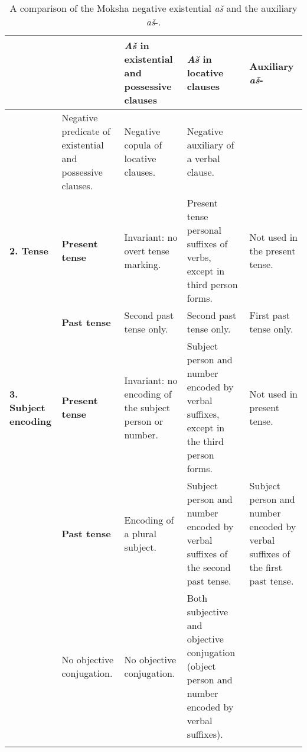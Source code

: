 \documentclass[output=paper]{langsci/langscibook}
\begin{document}
\begin{table}
\newlength{\colconj}
\newlength{\colexist}\settowidth{\colexist}{encoding of the}
\newlength{\colloc}\settowidth{\colloc}{verbal suffixes of}
\newlength{\colaux}\settowidth{\colaux}{verbal suffixes of}
\caption{A comparison of the Moksha negative existential \textit{aš} and the auxiliary \textit{aš}-.}
\label{tab:2:7}
\begin{tabularx}{\textwidth}{@{} p{\colclausfunc} p{\coltense} p{\colexist} p{\colloc} p{\colaux} @{}}
\lsptoprule
					&					&\textbf{\textit{Aš} in existential and possessive clauses}&\textbf{\textit{Aš} in locative clauses} 	&\textbf{Auxiliary \textit{aš}-}			\\
\midrule
\tablevspace
\multicolumn{2}{@{} l @{}}{
\textbf{1. Clausal function}}			&Negative predicate of existential and possessive clauses.	&Negative copula of locative clauses.			&Negative auxiliary of a verbal clause.\\
\tablevspace
\midrule
\textbf{2. Tense}	&\textbf{Present tense}
										& Invariant: no overt tense marking.							&Present tense personal suffixes of verbs, except in third person forms.
																																								&Not used in the present tense.		\\
					&\textbf{Past tense}
										&Second past tense only.										&Second past tense only.						&First past tense only.				\\
\tablevspace
\midrule
\textbf{3. Subject encoding}
					&\textbf{Present tense}
										& Invariant: no encoding of the subject person or number. 	&Subject person and number encoded by verbal suffixes, except in the third person forms.
																																								&Not used in present tense.\\
					&\textbf{Past tense}
										&Encoding of a plural subject.									&Subject person and number encoded by verbal suffixes of the second past tense.
																																								& Subject person and number encoded by verbal suffixes of the first past tense.\\
\tablevspace
\midrule
\multicolumn{2}{@{} p{\colconj} @{}}{
\textbf{4. Objective conjugation}}
										&No objective conjugation.										&No objective conjugation.						&Both subjective and objective conjugation (object person and number encoded by verbal suffixes).\\
\lspbottomrule
\end{tabularx}
\end{table}
\end{document}
